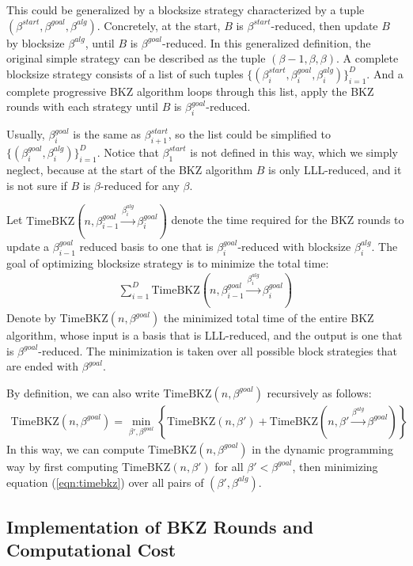 \documentclass[11pt]{article}
\newcommand{\TimeBKZ}{\mathrm{TimeBKZ}}
\begin{document}
This could be generalized by a blocksize strategy characterized by a tuple $(\beta^{start},\beta^{goal},\beta^{alg})$.
Concretely, at the start, $B$ is $\beta^{start}$-reduced, then update $B$ by blocksize $\beta^{alg}$, until $B$ is $\beta^{goal}$-reduced.
In this generalized definition, the original simple strategy can be described as the tuple $(\beta-1,\beta,\beta)$.
A complete blocksize strategy consists of a list of such tuples $\{(\beta_i^{start},\beta_i^{goal},\beta_i^{alg})\}_{i=1}^D$.
And a complete progressive BKZ algorithm loops through this list, apply the BKZ rounds with each strategy until $B$ is $\beta_i^{goal}$-reduced.

Usually, $\beta_i^{goal}$ is the same as $\beta_{i+1}^{start}$, so the list could be simplified to $\{(\beta_i^{goal},\beta_i^{alg})\}_{i=1}^D$.
Notice that $\beta_1^{start}$ is not defined in this way, which we simply neglect, because at the start of the BKZ algorithm $B$ is only LLL-reduced, and it is not sure if $B$ is $\beta$-reduced for any $\beta$.

Let $\TimeBKZ(n,\beta_{i-1}^{goal}\xrightarrow{\beta_i^{alg}}\beta_i^{goal})$ denote the time required for the BKZ rounds to update a $\beta_{i-1}^{goal}$ reduced basis to one that is $\beta_i^{goal}$-reduced with blocksize $\beta_i^{alg}$.
The goal of optimizing blocksize strategy is to minimize the total time:
\begin{eqnarray}
\sum_{i=1}^D\TimeBKZ(n,\beta_{i-1}^{goal}\xrightarrow{\beta_i^{alg}}\beta_i^{goal})
\end{eqnarray}
Denote by $\TimeBKZ(n,\beta^{goal})$ the minimized total time of the entire BKZ algorithm, whose input is a basis that is LLL-reduced, and the output is one that is $\beta^{goal}$-reduced.
The minimization is taken over all possible block strategies that are ended with $\beta^{goal}$.

By definition, we can also write $\TimeBKZ(n,\beta^{goal})$ recursively as follows:
\begin{eqnarray}
\TimeBKZ(n,\beta^{goal})=\min_{\beta',\beta^{goal}}\left\{\TimeBKZ(n,\beta')+\TimeBKZ(n,\beta'\xrightarrow{\beta^{alg}}\beta^{goal})\right\} \label{eqn:timebkz}
\end{eqnarray}
In this way, we can compute $\TimeBKZ(n,\beta^{goal})$ in the dynamic programming way by first computing $\TimeBKZ(n,\beta')$ for all $\beta'<\beta^{goal}$, then minimizing equation (\ref{eqn:timebkz}) over all pairs of $(\beta',\beta^{alg})$.

\subsection{Implementation of BKZ Rounds and Computational Cost}
\end{document}
